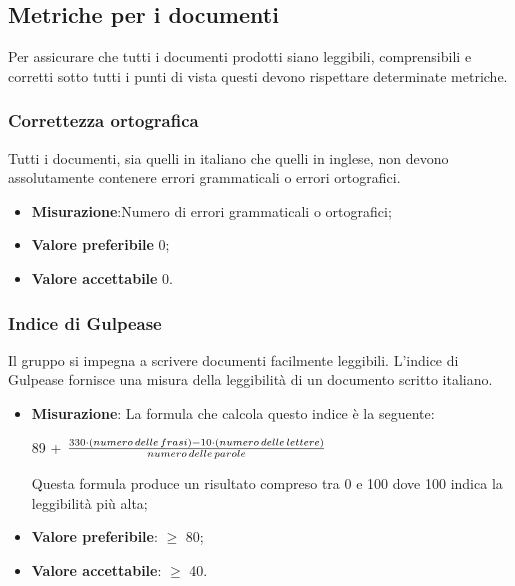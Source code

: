 	\subsection{Metriche per i documenti}
	Per assicurare che tutti i documenti prodotti siano leggibili, comprensibili e corretti sotto tutti i punti di vista questi devono rispettare determinate metriche.
	\subsubsection{Correttezza ortografica}
	Tutti i documenti, sia quelli in italiano che quelli in inglese, non devono assolutamente contenere errori grammaticali o errori ortografici. 
	\begin{itemize}
		\item \textbf{Misurazione}:Numero di errori grammaticali o ortografici;
		\item \textbf{Valore preferibile} 0;
		\item \textbf{Valore accettabile} 0.
	\end{itemize}
	\subsubsection{Indice di Gulpease}
	Il gruppo si impegna a scrivere documenti facilmente leggibili.
	L'indice di Gulpease fornisce una misura della leggibilità di un documento scritto italiano.
	\begin{itemize}
	\item \textbf{Misurazione}: La formula che calcola questo indice è la seguente:\\
	\centerline{ 89 + \(\frac{ {330 \cdot (numero \thinspace delle \thinspace frasi) - 10 \cdot (numero \thinspace delle \thinspace lettere)}}{numero \thinspace delle \thinspace parole} \)} 
	Questa formula produce un risultato compreso tra 0 e 100 dove 100 indica la leggibilità più alta;
	\item \textbf{Valore preferibile}: $\geq$ 80;
	\item \textbf{Valore accettabile}: $\geq$ 40.
	\end{itemize}

		

